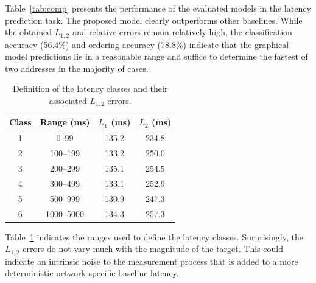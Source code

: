 \documentclass[10pt,a4paper,notitlepage,twocolumn]{article}
\begin{document}
Table~\ref{tab:comp} presents the performance of the evaluated models in the latency prediction task.
The proposed model clearly outperforms other baselines.
While the obtained $L_{1,2}$ and relative errors remain relatively high, the classification accuracy (56.4\%) and ordering accuracy (78.8\%) indicate that the graphical model predictions lie in a reasonable range and suffice to determine the fastest of two addresses in the majority of cases. 



\begin{table}[h]
\centering
\begin{tabular}{|cccc|}
\hline
Class & Range (ms) & $L_1$ (ms) & $L_2$ (ms) \\ \hline\hline
1 & 0--99 & 135.2 & 234.8 \\
2 & 100--199 & 133.2 & 250.0 \\
3 & 200--299 & 135.1 & 254.5 \\
4 & 300--499 & 133.1 & 252.9 \\
5 & 500--999 & 130.9 & 247.3 \\
6 & 1000--5000 & 134.3 & 257.3 \\
\hline 
\end{tabular} 
\caption{Definition of the latency classes and their associated $L_{1,2}$ errors.}
\label{tab:cl_l12}
\end{table}


Table~\ref{tab:cl_l12} indicates the ranges used to define the latency classes.
Surprisingly, the $L_{1,2}$ errors do not vary much with the magnitude of the target.
This could indicate an intrinsic noise to the measurement process that is added to a more deterministic network-specific baseline latency.
\end{document}
